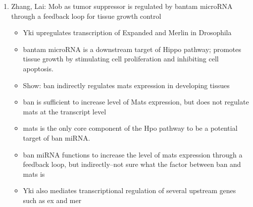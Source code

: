 \documentclass[12pt]{article}
\begin{document}
\begin{enumerate}
\begin{itemize}
\end{itemize}

\item Zhang, Lai: Mob as tumor suppressor is regulated by bantam microRNA through a feedback loop for tissue growth control
\begin{itemize}
	\item Yki upregulates transcription of Expanded and Merlin in Drosophila
	\item bantam microRNA is a downstream target of Hippo pathway; promotes tissue growth by stimulating cell proliferation and inhibiting cell apoptosis. 
	\item Show: ban indirectly regulates mats expression in developing tissues
	\item ban is sufficient to increase level of Mats expression, but does not regulate mats at the transcript level
	\item mats is the only core component of the Hpo pathway to be a potential target of ban miRNA. 
	\item ban miRNA functions to increase the level of mats expression through a feedback loop, but indirectly--not sure what the factor between ban and mats is
	\item Yki also mediates transcriptional regulation of several upstream genes such as ex and mer
\end{itemize}


\end{enumerate}
\end{document}
